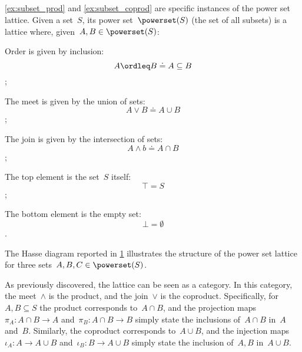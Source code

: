 \subsection{}
\cref{ex:subset_prod} and \cref{ex:subset_coprod} are specific instances of the power set lattice. Given a set~$S$, its power set~$\powerset(S)$ (the set of all subsets) is a lattice where, given~$A,B\in \powerset(S)$:
\begin{compactitem}
    \item Order is given by inclusion: $$A\ordleq B \doteq A\subseteq B$$;
    \item The meet is given by the union of sets: $$A\vee B \doteq A\cup B$$;
    \item The join is given by the intersection of sets: $$A\wedge b \doteq A\cap B$$;
    \item The top element is the set~$S$ itself: $$\top = S$$;
    \item The bottom element is the empty set: $$\bot = \emptyset$$.
\end{compactitem}
The Hasse diagram reported in \cref{fig:prod_coprod_power} illustrates the structure of the power set lattice for three sets~$A,B,C\in \powerset(S)$.

\begin{figure}[h]
    \begin{center}
    \end{center}
    \caption{\label{fig:prod_coprod_power}}
\end{figure}
As previously discovered, the lattice can be seen as a category.
In this category, the meet~$\wedge$ is the product, and the join~$\vee$ is the coproduct.
Specifically, for~$A,B\subseteq S$ the product corresponds to~$A\cap B$, and the projection maps~$\pi_A\colon A\cap B\to A$ and~$\pi_B\colon A\cap B\to B$ simply state the inclusions of~$A\cap B$ in~$A$ and~$B$.
Similarly, the coproduct corresponds to~$A\cup B$, and the injection maps~$\iota_A\colon A\to A\cup B$ and~$\iota_B\colon B\to A\cup B$ simply state the inclusion of~$A,B$ in~$A\cup B$.

\subsubsection{}

